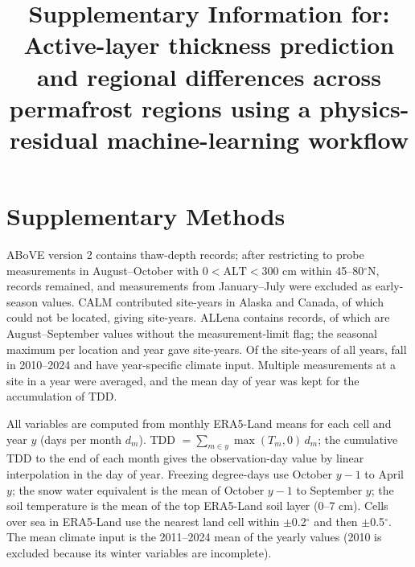 \documentclass[pdflatex,sn-nature]{sn-jnl}
\begin{document}
\title{Supplementary Information for: Active-layer thickness prediction and regional differences across permafrost regions using a physics-residual machine-learning workflow}
\author[1]{ }
\maketitle

\section{Supplementary Methods}

ABoVE version 2\cite{Moore2025} contains \nqcAboveRaw{} thaw-depth records; after restricting to probe measurements in August--October with $0<\mathrm{ALT}<300$ cm within 45--80$^\circ$N, \nqcAboveKept{} records remained, and \nqcAboveEarly{} measurements from January--July were excluded as early-season values. CALM\cite{Streletskiy2025} contributed \nqcCalmSy{} site-years in Alaska and Canada, of which \nqcCalmNoloc{} could not be located, giving \nqcCalmCy{} site-years. ALLena\cite{Veremeeva2025} contains \nqcLenaRaw{} records, of which \nqcLenaEos{} are August--September values without the measurement-limit flag; the seasonal maximum per location and year gave \nqcLenaCy{} site-years. Of the \nqcTotalCy{} site-years of all years, \nqcTotalCyIn{} fall in 2010--2024 and have year-specific climate input. Multiple measurements at a site in a year were averaged, and the mean day of year was kept for the accumulation of TDD.

All variables are computed from monthly ERA5-Land means for each cell and year $y$ (days per month $d_m$). TDD $=\sum_{m\in y}\max(T_m,0)\,d_m$; the cumulative TDD to the end of each month gives the observation-day value by linear interpolation in the day of year. Freezing degree-days use October $y-1$ to April $y$; the snow water equivalent is the mean of October $y-1$ to September $y$; the soil temperature is the mean of the top ERA5-Land soil layer (0--7 cm). Cells over sea in ERA5-Land use the nearest land cell within $\pm$0.2$^\circ$ and then $\pm$0.5$^\circ$. The mean climate input is the 2011--2024 mean of the yearly values (2010 is excluded because its winter variables are incomplete).
\end{document}
